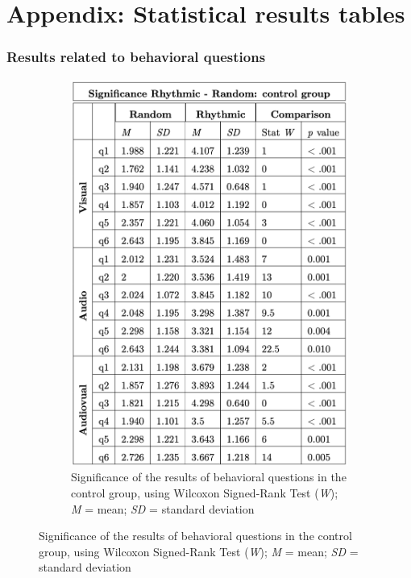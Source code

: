 \clearpage
\chapter*{Appendix: Statistical results tables}
\subsection*{Results related to behavioral questions}
\begin{figure}[H]
    \begin{subfigure}[b]{0.5\textwidth}
        \centering
        \includegraphics[width=\textwidth]{significance_tables/control_group.png}
        \caption{Significance of the results of behavioral questions in the control group, using Wilcoxon Signed-Rank Test (\textit{W}); \textit{M} = mean; \textit{SD} = standard deviation}
        \label{fig: significance_control_pop} 
    \end{subfigure}

\end{figure}
